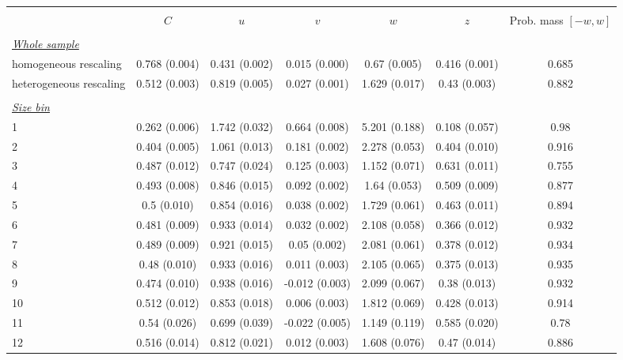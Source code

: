 
\begin{tabular}{@{\extracolsep{5pt}} l cccccc} 
\\[-1.8ex]\hline 
\hline \\[-1.8ex] 
 & $C$ & $u$ & $v$ & $w$ & $z$ & Prob. mass $[-w,w]$ \\ 
\hline \\[-1.8ex] 
\underline{{\it Whole sample}} &   &   &   &   &   &  \\ 
homogeneous rescaling & 0.768 (0.004) & 0.431 (0.002) & 0.015 (0.000) & 0.67 (0.005) & 0.416 (0.001) & 0.685 \\ 
heterogeneous rescaling & 0.512 (0.003) & 0.819 (0.005) & 0.027 (0.001) & 1.629 (0.017) & 0.43 (0.003) & 0.882 \\ 
 &   &   &   &   &   &  \\ 
\underline{{\it Size bin}} &   &   &   &   &   &  \\ 
1 & 0.262 (0.006) & 1.742 (0.032) & 0.664 (0.008) & 5.201 (0.188) & 0.108 (0.057) & 0.98 \\ 
2 & 0.404 (0.005) & 1.061 (0.013) & 0.181 (0.002) & 2.278 (0.053) & 0.404 (0.010) & 0.916 \\ 
3 & 0.487 (0.012) & 0.747 (0.024) & 0.125 (0.003) & 1.152 (0.071) & 0.631 (0.011) & 0.755 \\ 
4 & 0.493 (0.008) & 0.846 (0.015) & 0.092 (0.002) & 1.64 (0.053) & 0.509 (0.009) & 0.877 \\ 
5 & 0.5 (0.010) & 0.854 (0.016) & 0.038 (0.002) & 1.729 (0.061) & 0.463 (0.011) & 0.894 \\ 
6 & 0.481 (0.009) & 0.933 (0.014) & 0.032 (0.002) & 2.108 (0.058) & 0.366 (0.012) & 0.932 \\ 
7 & 0.489 (0.009) & 0.921 (0.015) & 0.05 (0.002) & 2.081 (0.061) & 0.378 (0.012) & 0.934 \\ 
8 & 0.48 (0.010) & 0.933 (0.016) & 0.011 (0.003) & 2.105 (0.065) & 0.375 (0.013) & 0.935 \\ 
9 & 0.474 (0.010) & 0.938 (0.016) & -0.012 (0.003) & 2.099 (0.067) & 0.38 (0.013) & 0.932 \\ 
10 & 0.512 (0.012) & 0.853 (0.018) & 0.006 (0.003) & 1.812 (0.069) & 0.428 (0.013) & 0.914 \\ 
11 & 0.54 (0.026) & 0.699 (0.039) & -0.022 (0.005) & 1.149 (0.119) & 0.585 (0.020) & 0.78 \\ 
12 & 0.516 (0.014) & 0.812 (0.021) & 0.012 (0.003) & 1.608 (0.076) & 0.47 (0.014) & 0.886 \\ 

\end{tabular}
